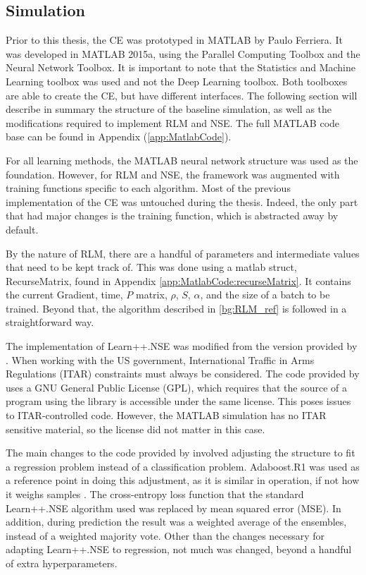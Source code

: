 \subsection{Simulation}
\par Prior to this thesis, the CE was prototyped in MATLAB by Paulo Ferriera\cite{paulo_theory_paper}. It was developed in MATLAB 2015a, using the Parallel Computing Toolbox and the Neural Network Toolbox. It is important to note that the Statistics and Machine Learning toolbox was used and not the Deep Learning toolbox. Both toolboxes are able to create the CE, but have different interfaces. The following section will describe in summary the structure of the baseline simulation, as well as the modifications required to implement RLM and NSE. The full MATLAB code base can be found in Appendix (\ref{app:MatlabCode}).
\par For all learning methods, the MATLAB neural network structure was used as the foundation. However, for RLM and NSE, the framework was augmented with training functions specific to each algorithm. Most of the previous implementation of the CE was untouched during the thesis. Indeed, the only part that had major changes is the training function, which is abstracted away by default. 
\par By the nature of RLM, there are a handful of parameters and intermediate values that need to be kept track of. This was done using a matlab struct, RecurseMatrix, found in Appendix \ref{app:MatlabCode:recurseMatrix}. It contains the current Gradient, time, $P$ matrix, $\rho$, $S$, $\alpha$, and the size of a batch to be trained. Beyond that, the algorithm described in \ref{bg:RLM_ref} is followed in a straightforward way.   
\par  The implementation of Learn++.NSE was modified from the version provided by \cite{placeholderCitation}. When working with the US government, International Traffic in Arms Regulations (ITAR) constraints must always be considered. The code provided by \cite{placeholderCitation} uses a GNU General Public License (GPL), which requires that the source of a program using the library is accessible under the same license. This poses issues to ITAR-controlled code. However, the MATLAB simulation has no ITAR sensitive material, so the license did not matter in this case.
\par The main changes to the code provided by \cite{placeholderCitation} involved adjusting the structure to fit a regression problem instead of a classification problem. Adaboost.R1 was used as a reference point in doing this adjustment, as it is similar in operation, if not how it weighs samples \cite{adaboostPaper}. The cross-entropy loss function that the standard Learn++.NSE algorithm used \cite{learnNseIntro} was replaced by mean squared error (MSE). In addition, during prediction the result was a weighted average of the ensembles, instead of a weighted majority vote. Other than the changes necessary for adapting Learn++.NSE to regression, not much was changed, beyond a handful of extra hyperparameters. 

